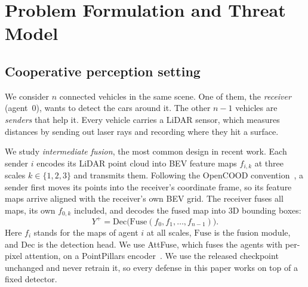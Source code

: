 \documentclass[conference]{IEEEtran}
\begin{document}
\section{Problem Formulation and Threat Model}
\label{sec:problem}
\subsection{Cooperative perception setting}
We consider $n$ connected vehicles in the same scene. One of them, the \emph{receiver} (agent~$0$), wants to
detect the cars around it. The other $n-1$ vehicles are \emph{senders} that help it. Every vehicle carries a
LiDAR sensor, which measures distances by sending out laser rays and recording
where they hit a surface.

We study \emph{intermediate fusion}, the most common design in recent work. Each sender $i$ encodes its LiDAR
point cloud into BEV feature maps $f_{i,k}$ at three scales $k\in\{1,2,3\}$ and transmits
them. Following the OpenCOOD convention~\cite{xu2022opv2v}, a sender first moves its points into the
receiver's coordinate frame, so its feature maps arrive aligned with the receiver's own BEV grid. The receiver
fuses all maps, its own $f_{0,k}$ included, and decodes the fused map into 3D bounding boxes:
\begin{equation}
Y^{+}=\mathrm{Dec}\big(\mathrm{Fuse}(f_{0},f_{1},\dots,f_{n-1})\big).
\label{eq:yplus}
\end{equation}
Here $f_i$ stands for the maps of agent $i$ at all scales, $\mathrm{Fuse}$ is the fusion module, and
$\mathrm{Dec}$ is the detection head. We use AttFuse, which fuses the agents with per-pixel attention, on a
PointPillars encoder~\cite{xu2022opv2v,lang2019pointpillars}. We use the released checkpoint unchanged and never
retrain it, so every defense in this paper works on top of a fixed detector.
\end{document}
